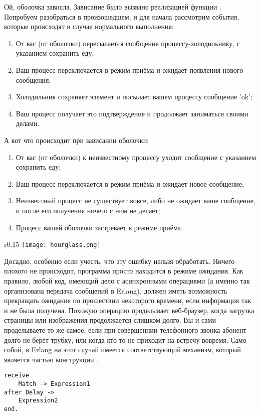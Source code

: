 Ой, оболочка зависла.
Зависание было вызвано реализацией функции .
Попробуем разобраться в произошедшем, и для начала рассмотрим события, которые происходят в случае нормального выполнения:
\begin{enumerate}
    \item От вас (от оболочки) пересылается сообщение процессу\--холодильнику, с указанием сохранить еду;
    \item Ваш процесс переключается в режим приёма и ожидает появления нового сообщения;
    \item Холодильник сохраняет элемент и посылает вашем процессу сообщение 'ok';
    \item Ваш процесс получает это подтверждение и продолжает заниматься своими делами.
\end{enumerate}
А вот что происходит при зависании оболочки:
\begin{enumerate}
    \item От вас (от оболочки) к неизвестному процессу уходит сообщение с указанием сохранить еду;
    \item Ваш процесс переключается в режим приёма и ожидает новое сообщение;
    \item Неизвестный процесс не существует вовсе, либо не ожидает ваше сообщение, и после его получения ничего с ним не делает;
    \item Процесс вашей оболочки застревает в режиме приёма.
\end{enumerate}
\begin{wrapfigure}{r}{0.15\linewidth}
    \texttt{[image: hourglass.png]}
\end{wrapfigure}

Досадно, особенно если учесть, что эту ошибку нельзя обработать.
Ничего плохого не происходит, программа просто находится в режиме ожидания.
Как правило, любой код, имеющий дело с асинхронными операциями (а именно так организована передача сообщений в Erlang), должен иметь возможность прекращать ожидание по прошествии некоторого времени, если информация так и не была получена.
Похожую операцию проделывает веб\--браузер, когда загрузка страницы или изображения продолжается слишком долго.
Вы и сами проделываете то же самое, если при совершеннии телефонного звонка абонент долго не берёт трубку, или когда кто\--то не приходит на встречу вовремя.
Само собой, в Erlang на этот случай имеется соответствующий механизм, который является частью конструкции .
\begin{lstlisting}[style=erlang]
receive
    Match -> Expression1
after Delay ->
    Expression2
end.
\end{lstlisting}


